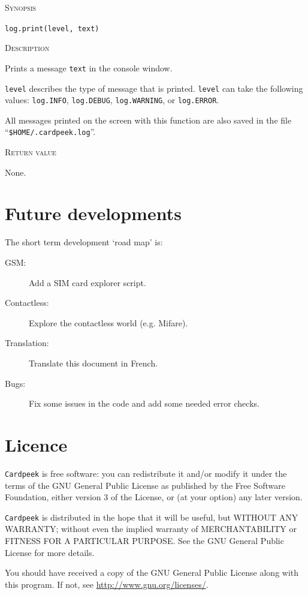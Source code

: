 \documentclass[11pt]{report}
\newcommand{\mansection}[1]{\vspace{0.5em}\par\noindent\textsc{#1}\vspace{0.5em}\par}
\begin{document}
\mansection{Synopsis}
\texttt{log.print(level, text)}

\mansection{Description}
  Prints a message \texttt{text} in the console window.

  \texttt{level} describes the type of message that is printed. 
  \texttt{level} can take the following values: \texttt{log.INFO}, 
  \texttt{log.DEBUG}, \texttt{log.WARNING}, or \texttt{log.ERROR}.

  All messages printed on the screen with this function are also 
  saved in the file ``\texttt{\$HOME/.cardpeek.log}''.
\mansection{Return value}
  None.


\chapter{Future developments}

The short term development `road map' is:
\begin{description}
\item[GSM:]{Add a SIM card explorer script.}
\item[Contactless:]{Explore the contactless world (e.g. Mifare).}
\item[Translation:]{Translate this document in French.}
\item[Bugs:]{Fix some issues in the code and add some needed error checks.}
\end{description}

\chapter{Licence}
\label{chapter:licence}

\texttt{Cardpeek} is free software: you can redistribute it and/or modify
it under the terms of the GNU General Public License as published by
the Free Software Foundation, either version 3 of the License, or
(at your option) any later version.

\texttt{Cardpeek} is distributed in the hope that it will be useful,
but WITHOUT ANY WARRANTY; without even the implied warranty of
MERCHANTABILITY or FITNESS FOR A PARTICULAR PURPOSE.  See the
GNU General Public License for more details.

You should have received a copy of the GNU General Public License
along with this program.  If not, see \url{http://www.gnu.org/licenses/}.
\end{document}
